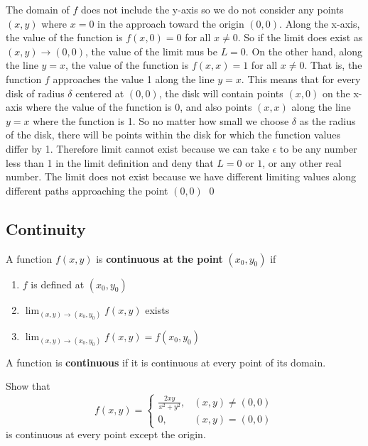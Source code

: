 \documentclass[12pt,a4paper,draft]{article}
\newenvironment{definition}{\begin{definitionbox}}{\end{definitionbox}\vspace{1\baselineskip}}
\begin{document}
\begin{solution}
    The domain of \(f\) does not include the y-axis so we do not consider any points \((x,y)\) where \(x=0\) in the approach toward the origin \((0,0)\). Along the x-axis, the value of the function is \( f(x,0) = 0\) for all \(x \neq 0\).
    So if the limit does exist as \((x,y) \to (0,0)\), the value of the limit mus be \(L = 0\). On the other hand, along the line \(y=x\), the value of the function is \(f(x,x) = 1\) for all \(x \neq 0\).
    That is, the function \(f\) approaches the value 1 along the line \(y=x\). This means that for every disk of radius \(\delta\) centered at \((0,0)\), the disk will contain points \((x,0)\) on the x-axis where the value of the function is 0, and also points \((x,x)\) along the line \(y=x\) where the function is 1.
    So no matter how small we choose \(\delta\) as the radius of the disk, there will be points within the disk for which the function values differ by 1. Therefore limit cannot exist because we can take \(\epsilon\) to be any number less than 1 in the limit definition and deny that \(\mathit{L} = 0\) or \(1\), or any other real number.
    The limit does not exist because we have different limiting values along different paths approaching the point \((0,0)\) \hfill \qed

\end{solution}

\subsection{Continuity}

\begin{definition}
    A function \(f(x,y)\) is \textbf{continuous at the point} \((x_0,y_0)\) if
    \begin{enumerate}
        \item \(f\) is defined at \((x_0,y_0)\)
        \item \(\lim_{(x,y) \to (x_0,y_0)}f(x,y)\) exists
        \item \(\lim_{(x,y) \to (x_0,y_0)}f(x,y) = f(x_0,y_0)\) 
    \end{enumerate}
    A function is \textbf{continuous} if it is continuous at every point of its domain.
\end{definition}

\begin{example}
    Show that
    \[f(x, y)= \begin{cases}\frac{2 x y}{x^2+y^2}, & (x, y) \neq(0,0) \\ 0, & (x, y)=(0,0)\end{cases}\]
    is continuous at every point except the origin.
\end{example}
\end{document}
